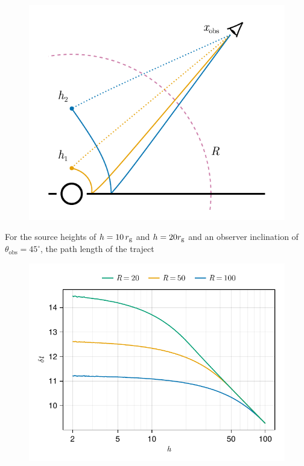 \begin{figure}
	\centering
	\includegraphics[width=0.80\linewidth]{figures/continuum-time.figure.pdf}
	\caption{}
	\label{fig:app:weak-field-approx}
\end{figure}

For the source heights of $h=10\, r_\text{g}$ and $h = 20 r_\text{g}$ and an observer inclination of $\theta_\text{obs} = 45^\circ$, the path length of the traject

\begin{figure}
	\centering
	\includegraphics[width=0.98\linewidth]{figures/continuum-time.weak-field.pdf}
	\caption{}
	\label{fig:app:continuum-time}
\end{figure}